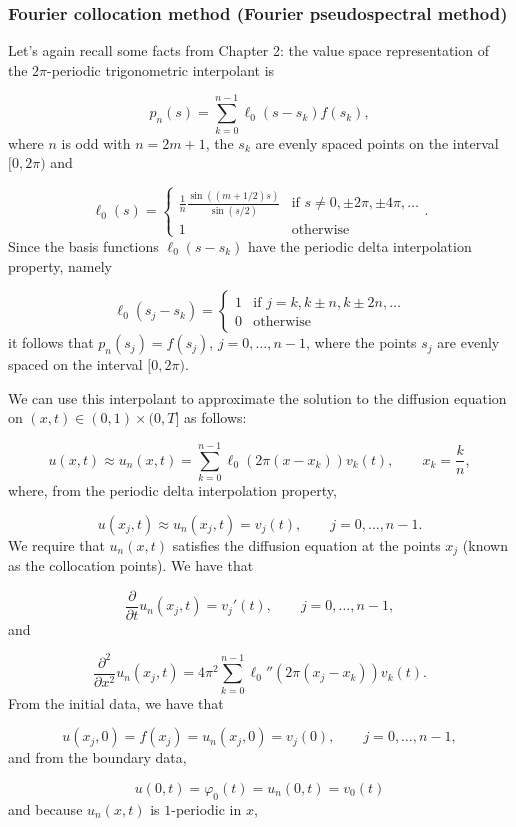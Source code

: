 \documentclass[12pt,a4paper]{article}
\begin{document}
\subsubsection{Fourier collocation method (Fourier pseudospectral method)}
Let's again recall some facts from Chapter 2: the value space representation of the $2\pi$-periodic trigonometric interpolant is

\[
p_n(s) = \sum_{k=0}^{n-1}\ell_0(s-s_k)f(s_k), 
\]
where $n$ is odd with $n = 2m + 1$, the $s_k$ are evenly spaced points on the interval $[0, 2\pi)$ and

\[
\ell_0(s) = \begin{cases}
\displaystyle{\frac{1}{n}\frac{\sin((m+1/2)s)}{\sin(s/2)}} & \text{if } s \neq 0, \pm 2\pi, \pm 4\pi, \ldots \\
1 & \text{otherwise}
\end{cases}.
\]
Since the basis functions $\ell_0(s-s_k)$ have the periodic delta interpolation property, namely

\[
\ell_0(s_j-s_k) = \begin{cases}
1 & \text{if } j = k, k \pm n, k \pm 2n, \ldots \\
0 & \text{otherwise}
\end{cases}
\]
it follows that $p_n(s_j) = f(s_j)$, $j = 0, \ldots, n-1$, where the points $s_j$ are evenly spaced on the interval $[0, 2\pi)$.

We can use this interpolant to approximate the solution to the diffusion equation on $(x,t) \in (0,1)\times (0, T]$ as follows: 

\[
u(x,t) \approx u_n(x,t) = \sum_{k=0}^{n-1}\ell_0(2\pi (x- x_k))v_k(t), \qquad x_k = \frac{k}{n},
\]
where, from the periodic delta interpolation property,

\[
u(x_j,t) \approx u_n(x_j,t) = v_j(t), \qquad j = 0, \ldots, n-1.
\]
We require that $u_n(x,t)$ satisfies the diffusion equation at the points $x_j$ (known as the collocation points). We have that

\[
\frac{\partial}{\partial t}u_n(x_j,t) = v_j'(t), \qquad j = 0, \ldots, n-1,
\]
and

\[
\frac{\partial^2}{\partial x^2}u_n(x_j,t) = 4\pi^2 \sum_{k=0}^{n-1}\ell_0''(2\pi (x_j- x_k))v_k(t).
\]
From the initial data, we have that

\[
u(x_j,0) = f(x_j) = u_n(x_j,0) = v_j(0), \qquad j = 0, \ldots, n-1,
\]
and from the boundary data,

\[
u(0,t) = \varphi_0(t) = u_n(0,t) = v_0(t)
\]
and because $u_n(x,t)$ is $1$-periodic in $x$,
\end{document}
